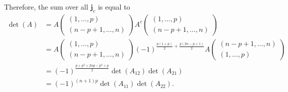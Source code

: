 \begin{solution}
\begin{itemize}
      Therefore, the sum over all $\mathbf{j}_c$
      is equal to
      \begin{align*}
        \det(A) & =
        A
        \begin{pmatrix}
          (1, \ldots, p)\\
          (n-p+1, \ldots, n)
        \end{pmatrix}
        A^c
        \begin{pmatrix}
          (1, \ldots, p)\\
          (n-p+1, \ldots, n)
        \end{pmatrix}\\
        & = A
        \begin{pmatrix}
          (1, \ldots, p)\\
          (n-p+1, \ldots, n)
        \end{pmatrix}
        (-1)^{\frac{p(1+p)}{2} + \frac{p(2n-p+1)}{2}}
        A
        \begin{pmatrix}
          (n-p+1, \ldots, n)\\
          (1, \ldots, p)
        \end{pmatrix}\\
        & = (-1)^{\frac{p + p^2 + 2np - p^2 + p}{2}}\det(A_{12}) \det(A_{21})\\
        & = (-1)^{(n+1)p}\det(A_{11}) \det(A_{22}).
      \end{align*}
  \end{itemize}
\end{solution}

\subsection{}
\nosolution

